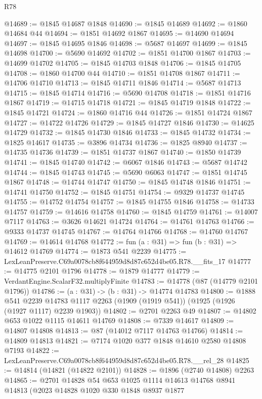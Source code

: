 \begin{lexlean}{R78}
\begin{coremodule}
@14689 := @1845 @14687 @1848
@14690 := @1845 @14689
@14692 := @1860 @14684 @44
@14694 := @1851 @14692 @1867
@14695 := @14690 @14694
@14697 := @1845 @14695 @1846
@14698 := @5687 @14697
@14699 := @1845 @14698
@14700 := @5690 @14692
@14702 := @1851 @14700 @1867
@14703 := @14699 @14702
@14705 := @1845 @14703 @1848
@14706 := @1845 @14705
@14708 := @1860 @14700 @44
@14710 := @1851 @14708 @1867
@14711 := @14706 @14710
@14713 := @1845 @14711 @1846
@14714 := @5687 @14713
@14715 := @1845 @14714
@14716 := @5690 @14708
@14718 := @1851 @14716 @1867
@14719 := @14715 @14718
@14721 := @1845 @14719 @1848
@14722 := @1845 @14721
@14724 := @1860 @14716 @44
@14726 := @1851 @14724 @1867
@14727 := @14722 @14726
@14729 := @1845 @14727 @1846
@14730 := @14625 @14729
@14732 := @1845 @14730 @1846
@14733 := @1845 @14732
@14734 := @1825 @14617
@14735 := @3896 @14734
@14736 := @1825 @8940
@14737 := @14735 @14736
@14739 := @1851 @14737 @1867
@14740 := @1850 @14739
@14741 := @1845 @14740
@14742 := @6067 @1846
@14743 := @5687 @14742
@14744 := @1845 @14743
@14745 := @5690 @6063
@14747 := @1851 @14745 @1867
@14748 := @14744 @14747
@14750 := @1845 @14748 @1846
@14751 := @14741 @14750
@14752 := @1845 @14751
@14754 := @9329 @14737 @14745
@14755 := @14752 @14754
@14757 := @1845 @14755 @1846
@14758 := @14733 @14757
@14759 := @14616 @14758
@14760 := @1845 @14759
@14761 := @14007 @7117
@14763 := @3626 @14621 @14724
@14764 := @14761 @14763
@14766 := @9333 @14737 @14745
@14767 := @14764 @14766
@14768 := @14760 @14767
@14769 := @14614 @14768
@14772 := fun (a : @31) => fun (b : @31) => @14612 @14769
@14774 := @1873 @541 @2239
@14775 := LexLeanPreserve.C69a0078cb8f644959d8d87c652d4be05.R78.__fits_17
@14777 := @14775 @2101 @1796
@14778 := @1879 @14777
@14779 := VerdantEngine.ScalarF32.multiplyFinite
@14783 := @14778 (@87 (@14779 @2101 @1796))
@14786 := (a : @31) -> (b : @31) -> @14774 @14783
@14800 := @1888
    @541
    @2239
    @14783
    @1117
    @2263
    (@1909 (@1919 @541))
    (@1925 (@1926 (@1927 @1117) @2239 @1903))
@14802 := @2701 @2263 @49
@14807 := @14802 @653 @1022 @1115 @14611 @14769
@14808 := @7339 @14617
@14809 := @14807 @14808
@14813 := @87 (@14012 @7117 @14763 @14766)
@14814 := @14809 @14813
@14821 := @7174 @1020 @377 @1848 @14610 @2580 @14808 @7193
@14822 := LexLeanPreserve.C69a0078cb8f644959d8d87c652d4be05.R78.__rel_28
@14825 := @14814 (@14821 (@14822 @2101))
@14828 := @1896 (@2740 @14808) @2263
@14865 := @2701
    @14828
    @54
    @653
    @1025
    @1114
    @14613
    @14768
    @8941
    @14813
    (@2023
      @14828
      @1020
      @330
      @1848
      @8937
      @1877

\end{coremodule}
\end{lexlean}
